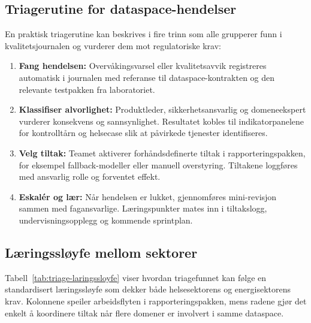 \subsection{Triagerutine for dataspace-hendelser}
En praktisk triagerutine kan beskrives i fire trinn som alle grupperer funn i kvalitetsjournalen og vurderer dem mot regulatoriske krav:
\begin{enumerate}
    \item \textbf{Fang hendelsen:} Overvåkingsvarsel eller kvalitetsavvik registreres automatisk i journalen med referanse til dataspace-kontrakten og den relevante testpakken fra laboratoriet.\citep{digdir2024sanntidsdata}
    \item \textbf{Klassifiser alvorlighet:} Produktleder, sikkerhetsansvarlig og domeneekspert vurderer konsekvens og sannsynlighet. Resultatet kobles til indikatorpanelene for kontrolltårn og helsecase slik at påvirkede tjenester identifiseres.\citep{energinorge2023beredskap}
    \item \textbf{Velg tiltak:} Teamet aktiverer forhåndsdefinerte tiltak i rapporteringspakken, for eksempel fallback-modeller eller manuell overstyring. Tiltakene loggføres med ansvarlig rolle og forventet effekt.
    \item \textbf{Eskalér og lær:} Når hendelsen er lukket, gjennomføres mini-revisjon sammen med fagansvarlige. Læringspunkter mates inn i tiltakslogg, undervisningsopplegg og kommende sprintplan.
\end{enumerate}

\subsection{Læringssløyfe mellom sektorer}
Tabell~\ref{tab:triage-laringssloyfe} viser hvordan triagefunnet kan følge en standardisert læringssløyfe som dekker både helsesektorens og energisektorens krav. Kolonnene speiler arbeidsflyten i rapporteringspakken, mens radene gjør det enkelt å koordinere tiltak når flere domener er involvert i samme dataspace.

